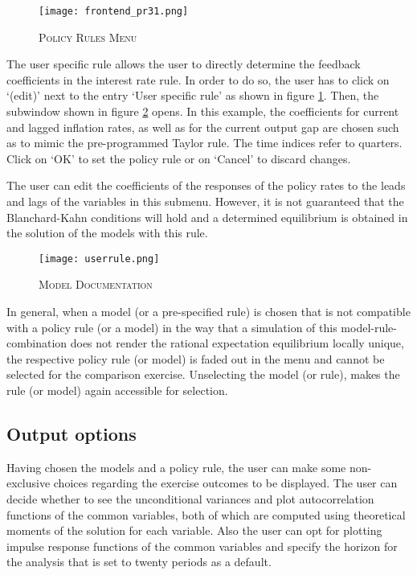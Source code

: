 \begin{figure}[H]
	\centering
	\caption{\textsc{Policy Rules Menu}}
	\vspace{0.2cm}
	\texttt{[image: frontend\_pr31.png]}\\
	\label{img:PR}
\end{figure}

The user specific rule allows the user to directly determine the feedback coefficients in the interest rate rule. In order to do so, the user has to click on `(edit)' next to the entry `User specific rule' as shown in figure \ref{img:PR}. Then, the subwindow shown in figure \ref{userrule} opens. In this example, the coefficients for current and lagged inflation rates, as well as for the current output gap are chosen such as to mimic the pre-programmed Taylor rule. The time indices refer to quarters. Click on `OK' to set the policy rule or on `Cancel' to discard changes.

The user can edit the coefficients of the responses of the policy rates to the leads and lags of the variables in this submenu. However, it is not guaranteed that the Blanchard-Kahn conditions will hold and a determined equilibrium is obtained in the solution of the models with this rule. 

\begin{figure}[H]
	\centering
	\caption{\textsc{Model Documentation}}
	\vspace{0.2cm}
	\texttt{[image: userrule.png]}\\
	\label{userrule}
\end{figure}

In general, when a model (or a pre-specified rule) is chosen that is not compatible with a policy rule (or a model) in the way that a simulation of this model-rule-combination does not render the rational expectation equilibrium locally unique, the respective policy rule (or model) is faded out in the menu and cannot be selected for the comparison exercise. Unselecting the model (or rule), makes the rule (or model) again accessible for selection. 

\subsection*{Output options}

Having chosen the models and a policy rule, the user can make some non-exclusive choices regarding the exercise outcomes to be displayed.
The user can decide whether to see the unconditional variances and plot autocorrelation functions of the common variables, both of which are computed using theoretical moments of the solution for each variable. Also the user can opt for plotting impulse response functions of the common variables and specify the horizon for the analysis that is set to twenty periods as a default. 

